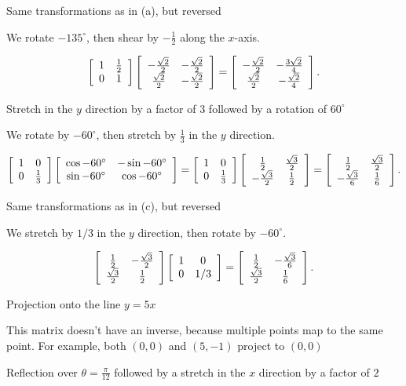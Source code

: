 \documentclass[../key.tex]{subfiles}
\begin{document}
\begin{inner_problem}
\item Same transformations as in (a), but reversed
\end{inner_problem}

We rotate $-135^\circ$, then shear by $-\frac{1}{2}$ along the $x$-axis.

$$\left[\begin{array}{cc} 1 & \frac{1}{2} \\ 0 & 1 \end{array}\right]\left[\begin{array}{cc} -\frac{\sqrt{2}}{2} & -\frac{\sqrt{2}}{2} \\ \frac{\sqrt{2}}{2} & -\frac{\sqrt{2}}{2} \end{array}\right] = \left[\begin{array}{cc} -\frac{\sqrt{2}}{2} & -\frac{3\sqrt{2}}{4} \\ \frac{\sqrt{2}}{2} & -\frac{\sqrt{2}}{4} \end{array}\right].$$

\begin{inner_problem}
\item Stretch in the $y$ direction by a factor of $3$ followed by a rotation of $60^\circ$
\end{inner_problem}

We rotate by $-60^\circ$, then stretch by $\frac{1}{3}$ in the $y$ direction.

$$\left[\begin{array}{cc} 1 & 0 \\ 0 & \frac{1}{3} \end{array}\right]\left[\begin{array}{cc} \cos -60^\circ & -\sin -60^\circ \\ \sin -60^\circ & \cos -60^\circ \end{array}\right] = \left[\begin{array}{cc} 1 & 0 \\ 0 & \frac{1}{3} \end{array}\right]\left[\begin{array}{cc} \frac{1}{2} & \frac{\sqrt{3}}{2} \\ -\frac{\sqrt{3}}{2} & \frac{1}{2} \end{array}\right] = \left[\begin{array}{cc} \frac{1}{2} & \frac{\sqrt{3}}{2} \\ -\frac{\sqrt{3}}{6} & \frac{1}{6} \end{array}\right].$$

\begin{inner_problem}
\item Same transformations as in (c), but reversed
\end{inner_problem}

We stretch by $1/3$ in the $y$ direction, then rotate by $-60^\circ$.

$$\left[\begin{array}{cc} \frac{1}{2} & -\frac{\sqrt{3}}{2} \\ \frac{\sqrt{3}}{2} & \frac{1}{2} \end{array}\right]\left[\begin{array}{cc} 1 & 0 \\ 0 & 1/3 \end{array}\right] = \left[\begin{array}{cc} \frac{1}{2} & -\frac{\sqrt{3}}{6} \\ \frac{\sqrt{3}}{2} & \frac{1}{6} \end{array}\right].$$

\begin{inner_problem}
\item Projection onto the line $y=5x$
\end{inner_problem}

This matrix doesn't have an inverse, because multiple points map to the same point. For example, both $(0,0)$ and $(5,-1)$ project to $(0,0)$

\begin{inner_problem}
\item Reflection over $\theta=\frac{\pi}{12}$ followed by a stretch in the $x$ direction by a factor of $2$
\end{inner_problem}
\end{document}

